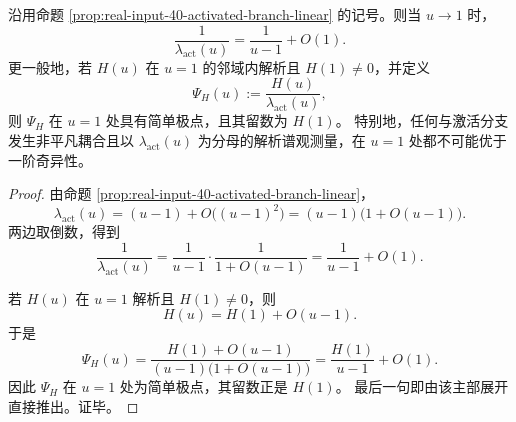 \begin{theorem}[激活分支诱导的普适一阶极点律]\label{thm:killo-real-input-40-activated-branch-simple-pole}
沿用命题 \ref{prop:real-input-40-activated-branch-linear} 的记号。则当 \(u\to 1\) 时，
\[
\frac{1}{\lambda_{\mathrm{act}}(u)}
=
\frac{1}{u-1}+O(1).
\]
更一般地，若 \(H(u)\) 在 \(u=1\) 的邻域内解析且 \(H(1)\neq 0\)，并定义
\[
\Psi_H(u):=\frac{H(u)}{\lambda_{\mathrm{act}}(u)},
\]
则 \(\Psi_H\) 在 \(u=1\) 处具有简单极点，且其留数为 \(H(1)\)。
特别地，任何与激活分支发生非平凡耦合且以 \(\lambda_{\mathrm{act}}(u)\) 为分母的解析谱观测量，在 \(u=1\) 处都不可能优于一阶奇异性。
\end{theorem}
\begin{proof}
由命题 \ref{prop:real-input-40-activated-branch-linear}，
\[
\lambda_{\mathrm{act}}(u)=(u-1)+O\!\bigl((u-1)^2\bigr)
=(u-1)\bigl(1+O(u-1)\bigr).
\]
两边取倒数，得到
\[
\frac{1}{\lambda_{\mathrm{act}}(u)}
=
\frac{1}{u-1}\cdot \frac{1}{1+O(u-1)}
=
\frac{1}{u-1}+O(1).
\]

若 \(H(u)\) 在 \(u=1\) 解析且 \(H(1)\neq 0\)，则
\[
H(u)=H(1)+O(u-1).
\]
于是
\[
\Psi_H(u)
=
\frac{H(1)+O(u-1)}{(u-1)\bigl(1+O(u-1)\bigr)}
=
\frac{H(1)}{u-1}+O(1).
\]
因此 \(\Psi_H\) 在 \(u=1\) 处为简单极点，其留数正是 \(H(1)\)。
最后一句即由该主部展开直接推出。证毕。
\end{proof}

\endinput
